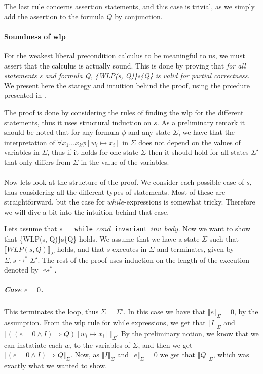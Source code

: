 The last rule concerns assertion statements, and this case is trivial, as we simply add the assertion to the formula $Q$ by conjunction.

\paragraph{Soundness of wlp}
For the weakest liberal precondition calculus to be meaningful to us, we must assert that the calculus is actually sound.
This is done by proving that \textit{for all statements s and formula Q, \{WLP(s, Q)\}s\{Q\} is valid for partial correctness}.
We present here the stategy and intuition behind the proof, using the prcedure presented in \cite{wlp}.

The proof is done by considering the rules of finding the wlp for the different statements, thus it uses structural induction on $s$.
As a preliminary remark it should be noted that for any formula $\phi$ and any state $\Sigma$, we have that the interpretation of $\forall x_{1} ... x_{k} \phi [w_{i} \mapsto x_{i}]$ in $\Sigma$ does not depend on the values of variables in $\Sigma$, thus if it holds for one state $\Sigma$ then it should hold for all states $\Sigma'$ that only differs from $\Sigma$ in the value of the variables.
\\~\\
Now lets look at the structure of the proof.
We consider each possible case of $s$, thus considering all the different types of statements.
Most of these are straightforward, but the case for $while$-expressions is somewhat tricky.
Therefore we will dive a bit into the intuition behind that case.

Lets assume that $s =$ \texttt{while $cond$ invariant $inv$ $body$}.
Now we want to show that \{WLP(s, Q)\}s\{Q\} holds. We assume that we have a state $\Sigma$ such that $\llbracket WLP(s, Q)\rrbracket_{\Sigma}$ holds, and that $s$ executes in $\Sigma$ and terminates, given by $\Sigma, s \rightsquigarrow^{*} \Sigma '$.
The rest of the proof uses induction on the length of the execution denoted by $\rightsquigarrow^{*}$.

\subparagraph{Case $e=0$.}
This terminates the loop, thus $\Sigma = \Sigma'$.
In this case we have that $\llbracket e \rrbracket_{\Sigma} = 0$, by the assumption.
From the wlp rule for while expressions, we get that $\llbracket I \rrbracket_{\Sigma}$ and $\llbracket ((e = 0 \land I) \Rightarrow Q) [ w_{i} \mapsto x_{i}] \rrbracket_{\Sigma}$.
By the preliminary notion, we know that we can instatiate each $w_{i}$ to the variables of $\Sigma$, and then we get $\llbracket (e = 0 \land I) \Rightarrow Q \rrbracket_{\Sigma}$.
Now, as $\llbracket I \rrbracket_{\Sigma}$ and $\llbracket e \rrbracket_{\Sigma} = 0$ we get that $\llbracket Q \rrbracket_{\Sigma}$, which was exactly what we wanted to show.


